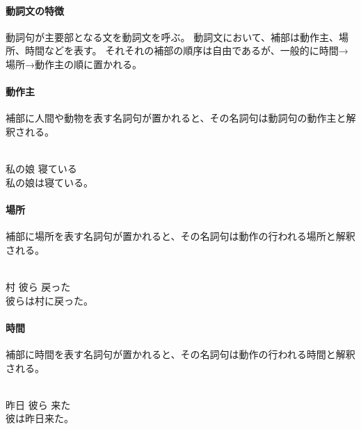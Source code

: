 \paragraph{動詞文の特徴}
動詞句が主要部となる文を動詞文を呼ぶ。
動詞文において、補部は動作主、場所、時間などを表す。
それそれの補部の順序は自由であるが、一般的に時間→場所→動作主の順に置かれる。

\paragraph{動作主}
補部に人間や動物を表す名詞句が置かれると、その名詞句は動詞句の動作主と解釈される。

\begin{exe}
    \ex {} \\
        私の娘 寝ている \\
    \glt 私の娘は寝ている。
\end{exe}

\paragraph{場所}
補部に場所を表す名詞句が置かれると、その名詞句は動作の行われる場所と解釈される。

\begin{exe}
    \ex {} \\
        村 彼ら 戻った \\
    \glt 彼らは村に戻った。
\end{exe}

\paragraph{時間}
補部に時間を表す名詞句が置かれると、その名詞句は動作の行われる時間と解釈される。

\begin{exe}
    \ex \gll [p\'a\'iip\'a] [k\'ae\textipa{O}p\'a] [v\textipa{E}\'ip\'a] \\
        昨日 彼ら 来た \\
    \glt 彼は昨日来た。
\end{exe}